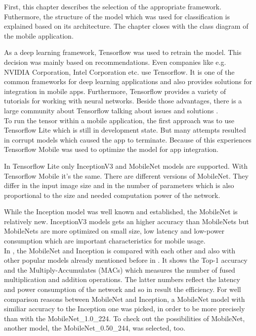 First, this chapter describes the selection of the appropriate framework. Futhermore, the structure of the model which was used for classification is explained based on its architecture. The chapter closes with the class diagram of the mobile application.

As a deep learning framework, Tensorflow was used to retrain the model. This decision was mainly based on recommendations. Even companies like e.g. NVIDIA Corporation, Intel Corporation etc. use Tensorflow. It is one of the common frameworks for deep learning applications and also provides solutions for integration in mobile apps. Furthermore, Tensorflow provides a variety of tutorials for working with neural networks. Beside those advantages, there is a large community about Tensorflow talking about issues and solutions \citep{Tensorflow2017}. \\

To run the tensor within a mobile application, the first approach was to use Tensorflow Lite which is still in development state. But many attempts resulted in corrupt models which caused the app to terminate. Because of this experiences Tensorflow Mobile was used to optimize the model for app integration. 
		
In Tensorflow Lite only InceptionV3 and MobileNet models are supported. With Tensorflow Mobile it's the same. There are different versions of MobileNet. They differ in the input image size and in the number of parameters which is also proportional to the size and needed computation power of the network.

While the Inception model was well known and established, the MobileNet is relatively new. InceptionV3 models gets an higher accuracy than MobileNets but MobileNets are more optimized on small size, low latency and low-power consumption which are important characteristics for mobile usage. \citep{TensorFlowMobileNet} \\


In , the MobileNet and Inception is compared with each other and also with other popular models already mentioned before in . It shows the Top-1 accuracy and the Multiply-Accumulates (MACs) which measures the number of fused multiplication and addition operations. The latter numbers reflect the latency and power consumption of the network and so in result the efficiency. For well comparison reasons between MobileNet and Inception, a MobileNet model with similiar accuracy to the Inception one was picked, in order to be more precisely than with the MobileNet\_1.0\_224. To check out the possibilities of MobileNet, another model, the MobileNet\_0.50\_244, was selected, too.

